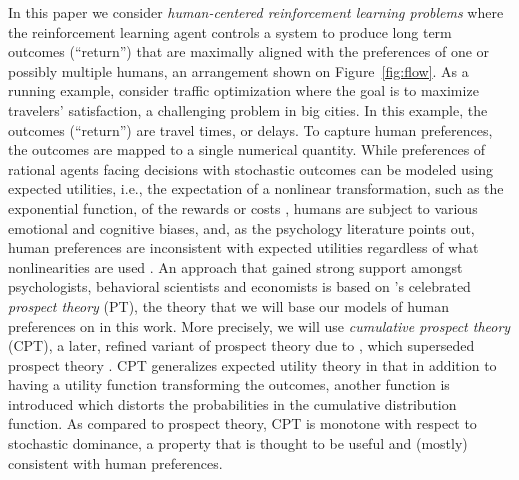 In this paper we consider \emph{human-centered reinforcement learning problems}
where the  reinforcement learning agent controls a system 
to produce long term outcomes (``return'') that are maximally aligned with the preferences of 
one or possibly multiple humans, an arrangement shown on Figure~\ref{fig:flow}.
As a running example, consider traffic optimization where the goal is to maximize
travelers' satisfaction, a challenging problem 
in big cities.
In this example, the outcomes (``return'') are travel times, or delays. 
To capture human preferences, the outcomes are mapped to a single numerical quantity.
While preferences of rational agents facing decisions with stochastic outcomes can be modeled using expected utilities,
i.e., the expectation of a nonlinear transformation, such as the exponential function, of the rewards or costs
\citep{NeuMo44,fishburn1970expectedutility}, 
	humans are subject to various emotional and cognitive biases,
	and, as the psychology literature points out, human preferences 
	are inconsistent with expected utilities regardless of what nonlinearities are used
	 \citep{allais53,ellsberg61,kahneman1979prospect}.
An approach that gained 
	strong support amongst psychologists, behavioral scientists and economists  \citep[e.g.,][]{starmer2000developments,quiggin2012generalized}
	is based on \cite{kahneman1979prospect}'s celebrated \emph{prospect theory} (PT),
	the theory that we will base our models of human preferences on
	 in this work.
More precisely, we will use \emph{cumulative prospect theory} (CPT),
 	a later, refined variant of prospect theory due to \citet{tversky1992advances}, 
	which superseded prospect theory \citep[e.g.,][]{Barberis:2012vs}.
CPT generalizes expected utility theory in that in addition to having a utility function transforming
	the outcomes, another function is introduced which distorts the probabilities in the cumulative distribution function.
As compared to prospect theory, CPT is monotone with respect to stochastic dominance, a property
	that is thought to be useful and (mostly) consistent with human preferences.
	
